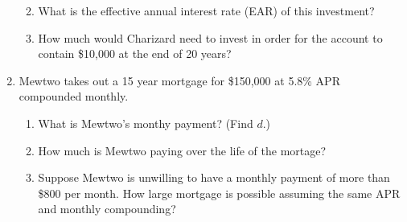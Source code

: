 \documentclass[12pt]{article}
\begin{document}
\begin{enumerate}
\begin{enumerate}
	\vfill
	\item What is the effective annual interest rate (EAR) of this investment?\vfill
	\item How much would Charizard need to invest in order for the account to contain \$10,000 at the end of 20 years?
	\vfill
	\end{enumerate}	
\item Mewtwo takes out a 15 year mortgage for \$150,000 at 5.8\% APR compounded monthly. 
	\begin{enumerate}
	\item What is Mewtwo's monthy payment? (Find $d.$)
	\vfill
	\item How much is Mewtwo paying over the life of the mortage?
	\vfill
	\item Suppose Mewtwo is unwilling to have a monthly payment of more than \$800 per month. How large mortgage is possible assuming the same APR and monthly compounding?
	\vfill
	\end{enumerate}
 \end{enumerate}
\end{document}
